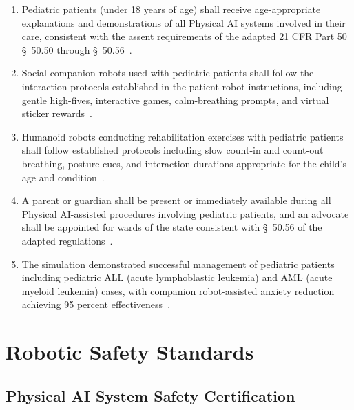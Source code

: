 \begin{enumerate}[label=(\alph*)]
\item Pediatric patients (under 18 years of age) shall receive age-appropriate
  explanations and demonstrations of all Physical AI systems involved in their
  care, consistent with the assent requirements of the adapted 21 CFR Part 50
  \S~50.50 through \S~50.56~\cite{cfr50adapt}.

\item Social companion robots used with pediatric patients shall follow the
  interaction protocols established in the patient robot instructions,
  including gentle high-fives, interactive games, calm-breathing prompts, and
  virtual sticker rewards~\cite{patientinstructions2026}.

\item Humanoid robots conducting rehabilitation exercises with pediatric
  patients shall follow established protocols including slow count-in and
  count-out breathing, posture cues, and interaction durations appropriate for
  the child's age and condition~\cite{patientinstructions2026}.

\item A parent or guardian shall be present or immediately available during all
  Physical AI-assisted procedures involving pediatric patients, and an advocate
  shall be appointed for wards of the state consistent with \S~50.56 of the
  adapted regulations~\cite{cfr50adapt}.

\item The simulation demonstrated successful management of pediatric patients
  including pediatric ALL (acute lymphoblastic leukemia) and AML (acute
  myeloid leukemia) cases, with companion robot-assisted anxiety reduction
  achieving 95 percent effectiveness~\cite{newtrial2026}.
\end{enumerate}

\section{Robotic Safety Standards}

\subsection{Physical AI System Safety Certification}

